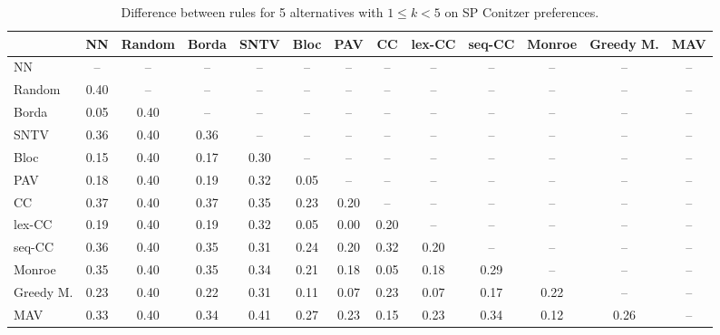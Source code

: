 
\begin{table*}[htbp]
\centering
\begin{tabular}{lcccccccccccc}
\toprule
 & NN & Random & Borda & SNTV & Bloc & PAV & CC & lex-CC & seq-CC & Monroe & Greedy M. & MAV \\
\midrule
NN & -- & -- & -- & -- & -- & -- & -- & -- & -- & -- & -- & -- \\
Random & \cellcolor{blue!40} 0.40 & -- & -- & -- & -- & -- & -- & -- & -- & -- & -- & -- \\
Borda & \cellcolor{blue!5} 0.05 & \cellcolor{blue!40} 0.40 & -- & -- & -- & -- & -- & -- & -- & -- & -- & -- \\
SNTV & \cellcolor{blue!36} 0.36 & \cellcolor{blue!40} 0.40 & \cellcolor{blue!36} 0.36 & -- & -- & -- & -- & -- & -- & -- & -- & -- \\
Bloc & \cellcolor{blue!15} 0.15 & \cellcolor{blue!40} 0.40 & \cellcolor{blue!17} 0.17 & \cellcolor{blue!30} 0.30 & -- & -- & -- & -- & -- & -- & -- & -- \\
PAV & \cellcolor{blue!18} 0.18 & \cellcolor{blue!40} 0.40 & \cellcolor{blue!19} 0.19 & \cellcolor{blue!32} 0.32 & \cellcolor{blue!5} 0.05 & -- & -- & -- & -- & -- & -- & -- \\
CC & \cellcolor{blue!37} 0.37 & \cellcolor{blue!40} 0.40 & \cellcolor{blue!37} 0.37 & \cellcolor{blue!35} 0.35 & \cellcolor{blue!23} 0.23 & \cellcolor{blue!20} 0.20 & -- & -- & -- & -- & -- & -- \\
lex-CC & \cellcolor{blue!19} 0.19 & \cellcolor{blue!40} 0.40 & \cellcolor{blue!19} 0.19 & \cellcolor{blue!32} 0.32 & \cellcolor{blue!5} 0.05 & \cellcolor{blue!0} 0.00 & \cellcolor{blue!20} 0.20 & -- & -- & -- & -- & -- \\
seq-CC & \cellcolor{blue!36} 0.36 & \cellcolor{blue!40} 0.40 & \cellcolor{blue!35} 0.35 & \cellcolor{blue!31} 0.31 & \cellcolor{blue!24} 0.24 & \cellcolor{blue!20} 0.20 & \cellcolor{blue!32} 0.32 & \cellcolor{blue!20} 0.20 & -- & -- & -- & -- \\
Monroe & \cellcolor{blue!35} 0.35 & \cellcolor{blue!40} 0.40 & \cellcolor{blue!35} 0.35 & \cellcolor{blue!34} 0.34 & \cellcolor{blue!21} 0.21 & \cellcolor{blue!18} 0.18 & \cellcolor{blue!5} 0.05 & \cellcolor{blue!18} 0.18 & \cellcolor{blue!28} 0.29 & -- & -- & -- \\
Greedy M. & \cellcolor{blue!23} 0.23 & \cellcolor{blue!40} 0.40 & \cellcolor{blue!22} 0.22 & \cellcolor{blue!31} 0.31 & \cellcolor{blue!11} 0.11 & \cellcolor{blue!7} 0.07 & \cellcolor{blue!23} 0.23 & \cellcolor{blue!7} 0.07 & \cellcolor{blue!17} 0.17 & \cellcolor{blue!22} 0.22 & -- & -- \\
MAV & \cellcolor{blue!33} 0.33 & \cellcolor{blue!40} 0.40 & \cellcolor{blue!34} 0.34 & \cellcolor{blue!41} 0.41 & \cellcolor{blue!27} 0.27 & \cellcolor{blue!23} 0.23 & \cellcolor{blue!15} 0.15 & \cellcolor{blue!23} 0.23 & \cellcolor{blue!34} 0.34 & \cellcolor{blue!12} 0.12 & \cellcolor{blue!26} 0.26 & -- \\
\bottomrule
\end{tabular}

\caption{Difference between rules for 5 alternatives with $1 \leq k < 5$ on SP Conitzer preferences.}
\label{tab:rule_distance_heatmap-m=[5]-pref_dist=single_peaked_conitzer}
\end{table*}
    